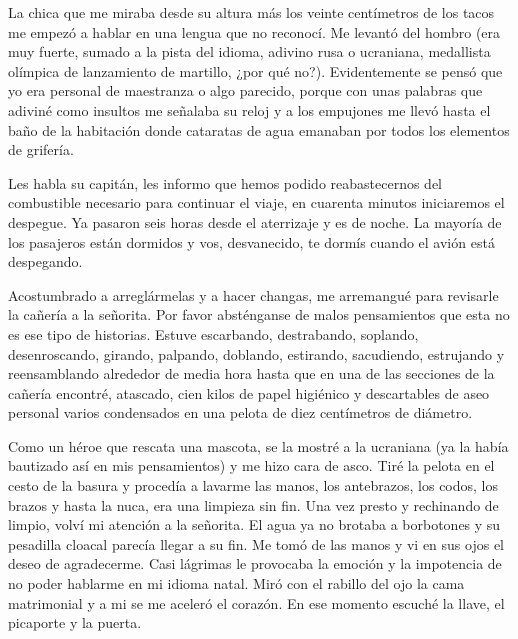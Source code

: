 \documentclass[12pt,twoside,openright,a5paper]{book}
\begin{document}
La chica que me miraba desde su altura más los veinte centímetros de
los tacos me empezó a hablar en una lengua que no reconocí. Me levantó
del hombro (era muy fuerte, sumado a la pista del idioma, adivino rusa o
ucraniana, medallista olímpica de lanzamiento de martillo, ¿por qué
no?). Evidentemente se pensó que yo era personal de maestranza o algo
parecido, porque con unas palabras que adiviné como insultos me señalaba
su reloj y a los empujones me llevó hasta el baño de la habitación donde
cataratas de agua emanaban por todos los elementos de grifería.


\vspace{0.5cm}
\hrulefill\hspace{0.2cm} \decofourleft\decofourright \hspace{0.2cm} \hrulefill
\vspace{0.5cm}

Les habla su capitán, les informo que hemos podido reabastecernos
del combustible necesario para continuar el viaje, en cuarenta minutos
iniciaremos el despegue. Ya pasaron seis horas desde el aterrizaje y es
de noche. La mayoría de los pasajeros están dormidos y vos, desvanecido,
te dormís cuando el avión está despegando.


\vspace{0.5cm}
\hrulefill\hspace{0.2cm} \decofourleft\decofourright \hspace{0.2cm} \hrulefill
\vspace{0.5cm}

  Acostumbrado a
arreglármelas y a hacer changas, me arremangué para revisarle la cañería a
la señorita. Por favor absténganse de malos pensamientos que esta no es ese
tipo de historias. Estuve escarbando, destrabando, soplando, desenroscando,
girando, palpando, doblando, estirando, sacudiendo, estrujando y reensamblando
alrededor de media hora hasta que en una de las secciones de la cañería
encontré, atascado, cien kilos de papel higiénico y descartables de aseo
personal varios condensados en una pelota de diez centímetros de diámetro.

Como un héroe que rescata una mascota, se la mostré a la ucraniana (ya la
había bautizado así en mis pensamientos) y me hizo cara de asco. Tiré
la pelota en el cesto de la basura y procedía a lavarme las manos, los
antebrazos, los codos, los brazos y hasta la nuca, era una limpieza sin fin.
Una vez presto y rechinando de limpio, volví mi atención a la señorita. El
agua ya no brotaba a borbotones y su pesadilla cloacal parecía llegar a su
fin. Me tomó de las manos y vi en sus ojos el deseo de agradecerme. Casi
lágrimas le provocaba la emoción y la impotencia de no poder hablarme en
mi idioma natal. Miró con el rabillo del ojo la cama matrimonial y a mi
se me aceleró el corazón. En ese momento escuché la llave, el picaporte
y la puerta.
\end{document}
